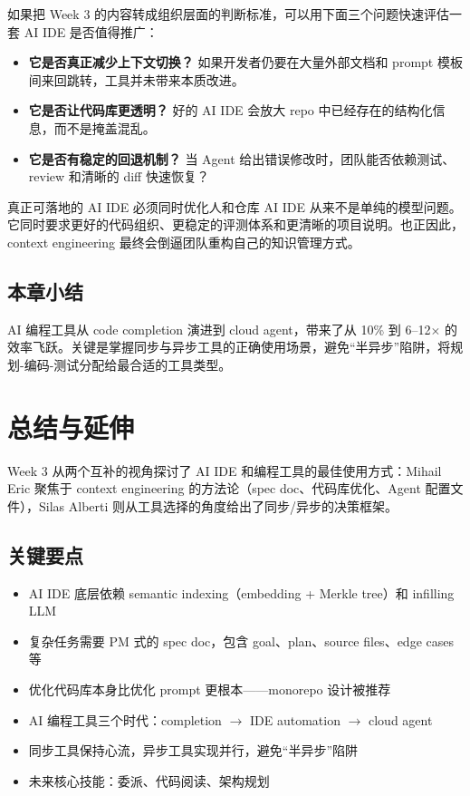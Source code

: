 \documentclass[a4paper]{article}
\begin{document}
如果把 Week 3 的内容转成组织层面的判断标准，可以用下面三个问题快速评估一套 AI IDE 是否值得推广：

\begin{itemize}
    \item \textbf{它是否真正减少上下文切换？} 如果开发者仍要在大量外部文档和 prompt 模板间来回跳转，工具并未带来本质改进。
    \item \textbf{它是否让代码库更透明？} 好的 AI IDE 会放大 repo 中已经存在的结构化信息，而不是掩盖混乱。
    \item \textbf{它是否有稳定的回退机制？} 当 Agent 给出错误修改时，团队能否依赖测试、review 和清晰的 diff 快速恢复？
\end{itemize}

\begin{knowledgebox}{真正可落地的 AI IDE 必须同时优化人和仓库}
AI IDE 从来不是单纯的模型问题。它同时要求更好的代码组织、更稳定的评测体系和更清晰的项目说明。也正因此，context engineering 最终会倒逼团队重构自己的知识管理方式。
\end{knowledgebox}

\subsection{本章小结}

AI 编程工具从 code completion 演进到 cloud agent，带来了从 10\% 到 6--12$\times$ 的效率飞跃。关键是掌握同步与异步工具的正确使用场景，避免``半异步''陷阱，将规划-编码-测试分配给最合适的工具类型。

\section{总结与延伸}

Week 3 从两个互补的视角探讨了 AI IDE 和编程工具的最佳使用方式：Mihail Eric 聚焦于 context engineering 的方法论（spec doc、代码库优化、Agent 配置文件），Silas Alberti 则从工具选择的角度给出了同步/异步的决策框架。

\subsection{关键要点}

\begin{itemize}
    \item AI IDE 底层依赖 semantic indexing（embedding + Merkle tree）和 infilling LLM
    \item 复杂任务需要 PM 式的 spec doc，包含 goal、plan、source files、edge cases 等
    \item 优化代码库本身比优化 prompt 更根本——monorepo 设计被推荐
    \item AI 编程工具三个时代：completion $\rightarrow$ IDE automation $\rightarrow$ cloud agent
    \item 同步工具保持心流，异步工具实现并行，避免``半异步''陷阱
    \item 未来核心技能：委派、代码阅读、架构规划
\end{itemize}
\end{document}
